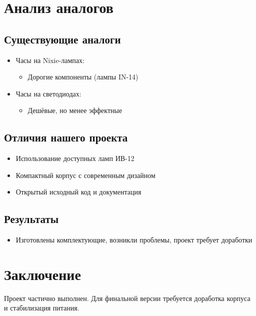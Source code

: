 \documentclass[a4paper,12pt]{article}
\begin{document}
\section{Анализ аналогов}
\subsection{Существующие аналоги}
\begin{itemize}
    \item Часы на Nixie-лампах:
    \begin{itemize}
        \item Дорогие компоненты (лампы IN-14)
    \end{itemize}
    
    \item Часы на светодиодах:
    \begin{itemize}
        \item Дешёвые, но менее эффектные
    \end{itemize}
\end{itemize}

\subsection{Отличия нашего проекта}
\begin{itemize}
    \item Использование доступных ламп ИВ-12
    \item Компактный корпус с современным дизайном
    \item Открытый исходный код и документация
\end{itemize}


\subsection{Результаты}
\begin{itemize}
    \item Изготовлены комплектующие, возникли проблемы, проект требует доработки
\end{itemize}

\section{Заключение}
Проект частично выполнен. Для финальной версии требуется доработка корпуса и стабилизация питания.
\end{document}
